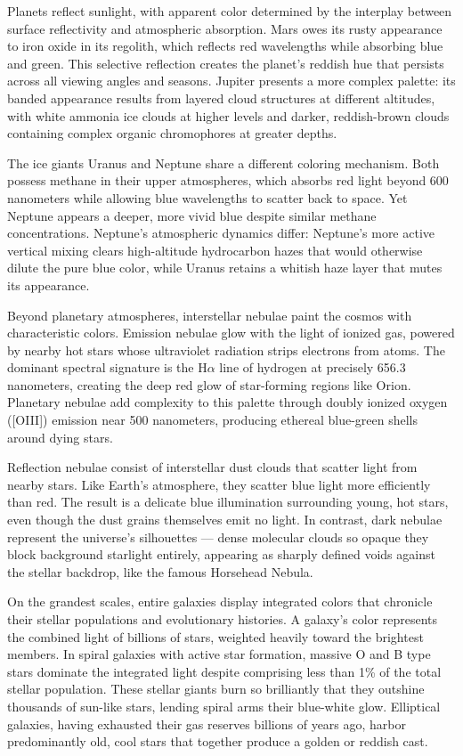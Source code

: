 Planets reflect sunlight, with apparent color determined by the interplay between surface reflectivity and atmospheric absorption. Mars owes its rusty appearance to iron oxide in its regolith, which reflects red wavelengths while absorbing blue and green. This selective reflection creates the planet's reddish hue that persists across all viewing angles and seasons. Jupiter presents a more complex palette: its banded appearance results from layered cloud structures at different altitudes, with white ammonia ice clouds at higher levels and darker, reddish-brown clouds containing complex organic chromophores at greater depths.

The ice giants Uranus and Neptune share a different coloring mechanism. Both possess methane in their upper atmospheres, which absorbs red light beyond 600 nanometers while allowing blue wavelengths to scatter back to space. Yet Neptune appears a deeper, more vivid blue despite similar methane concentrations. Neptune's atmospheric dynamics differ: Neptune's more active vertical mixing clears high-altitude hydrocarbon hazes that would otherwise dilute the pure blue color, while Uranus retains a whitish haze layer that mutes its appearance.

Beyond planetary atmospheres, interstellar nebulae paint the cosmos with characteristic colors. Emission nebulae glow with the light of ionized gas, powered by nearby hot stars whose ultraviolet radiation strips electrons from atoms. The dominant spectral signature is the H$\alpha$ line of hydrogen at precisely 656.3 nanometers, creating the deep red glow of star-forming regions like Orion. Planetary nebulae add complexity to this palette through doubly ionized oxygen ([OIII]) emission near 500 nanometers, producing ethereal blue-green shells around dying stars.

Reflection nebulae consist of interstellar dust clouds that scatter light from nearby stars. Like Earth's atmosphere, they scatter blue light more efficiently than red. The result is a delicate blue illumination surrounding young, hot stars, even though the dust grains themselves emit no light. In contrast, dark nebulae represent the universe's silhouettes — dense molecular clouds so opaque they block background starlight entirely, appearing as sharply defined voids against the stellar backdrop, like the famous Horsehead Nebula.

On the grandest scales, entire galaxies display integrated colors that chronicle their stellar populations and evolutionary histories. A galaxy's color represents the combined light of billions of stars, weighted heavily toward the brightest members. In spiral galaxies with active star formation, massive O and B type stars dominate the integrated light despite comprising less than 1\% of the total stellar population. These stellar giants burn so brilliantly that they outshine thousands of sun-like stars, lending spiral arms their blue-white glow. Elliptical galaxies, having exhausted their gas reserves billions of years ago, harbor predominantly old, cool stars that together produce a golden or reddish cast.

